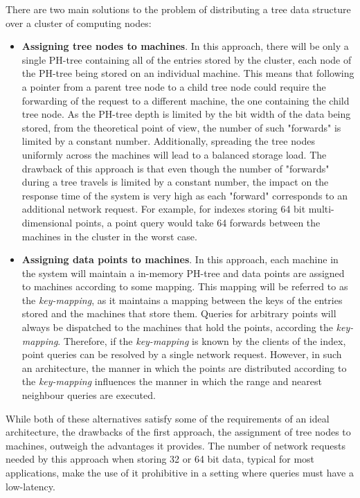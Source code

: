 \documentclass[11pt,a4paper]{globis-book}
\begin{document}
There are two main solutions to the problem of distributing a tree data structure over a cluster of computing nodes: 
\begin{itemize}
    \item \textbf{Assigning tree nodes to machines}. In this approach, there will be only a single PH-tree containing all of the entries stored by the cluster, each node of the PH-tree being stored on an individual machine. This means that following a pointer from a parent tree node to a child tree node could require the forwarding of the request to a different machine, the one containing the child tree node. As the PH-tree depth is limited by the bit width of the data being stored, from the theoretical point of view, the number of such "forwards" is limited by a constant number. Additionally, spreading the tree nodes uniformly across the machines will lead to a balanced storage load. The drawback of this approach is that even though the number of "forwards" during a tree travels is limited by a constant number, the impact on the response time of the system is very high as each "forward" corresponds to an additional network request. For example, for indexes storing 64 bit multi-dimensional points, a point query would take 64 forwards between the machines in the cluster in the worst case.  
    \item \textbf{Assigning data points to machines}. In this approach, each machine in the system will maintain a in-memory PH-tree and data points are assigned to machines according to some mapping. This mapping will be referred to as the \textit{key-mapping}, as it maintains a mapping between the keys of the entries stored and the machines that store them. Queries for arbitrary points will always be dispatched to the machines that hold the points, according the \textit{key-mapping}. Therefore, if the \textit{key-mapping} is known by the clients of the index, point queries can be resolved by a single network request. However, in such an architecture, the manner in which the points are distributed according to the \textit{key-mapping} influences the manner in which the range and nearest neighbour queries are executed. 
\end{itemize}

While both of these alternatives satisfy some of the requirements of an ideal architecture, the drawbacks of the first approach, the assignment of tree nodes to machines, outweigh the advantages it provides. The number of network requests needed by this approach when storing 32 or 64 bit data, typical for most applications, make the use of it prohibitive in a setting where queries must have a low-latency.
\end{document}
